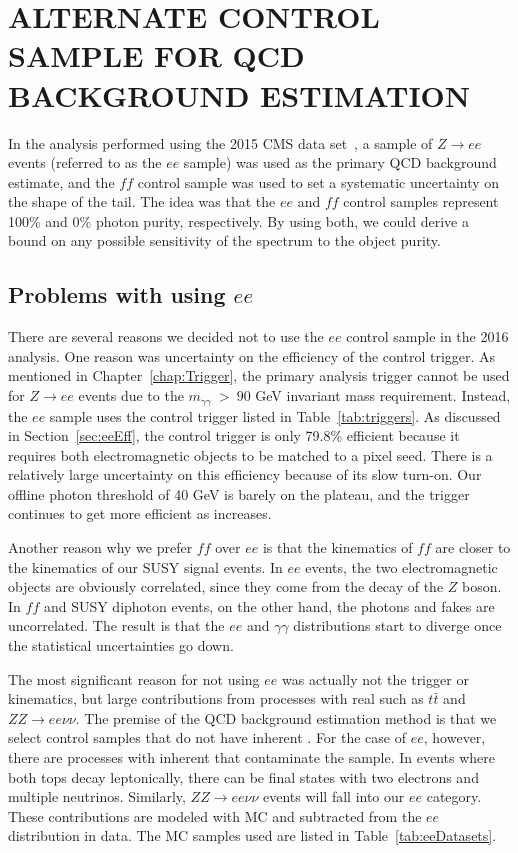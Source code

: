 \chapter{ALTERNATE CONTROL SAMPLE FOR QCD BACKGROUND ESTIMATION}
\label{app:ee}
In the analysis performed using the 2015 CMS data set~\cite{CMS:2015_anal}, 
a sample of $Z\rightarrow ee$ events (referred to as the $ee$ sample) was used as the 
primary QCD background estimate, and the $ff$ control 
sample was used to set a systematic uncertainty on the shape of the \ETmiss tail.
The idea was that the $ee$ and $ff$ control samples represent
100$\%$ and 0$\%$ photon purity, respectively. By using both, we could
derive a bound on any possible sensitivity of the \ETmiss spectrum
to the object purity. 

\section{Problems with using $ee$}
\label{sec:eeProblems}
There are several reasons we decided not to use the $ee$ control sample
 in the 2016 analysis. One reason was uncertainty on 
 the efficiency of the control 
 trigger. As mentioned in Chapter~\ref{chap:Trigger},
the primary analysis trigger 
cannot be used for $Z\rightarrow ee$ events due to the $m_{\gamma\gamma}~>~90$ GeV
invariant mass requirement. Instead, the $ee$ sample uses the control trigger 
listed in Table~\ref{tab:triggers}. As discussed in Section~\ref{sec:eeEff}, the
control trigger is only 79.8\% efficient because it 
requires both electromagnetic objects to be matched to a 
pixel seed. There is a relatively 
large uncertainty on this efficiency because of its
slow turn-on. Our offline photon \pT threshold of 40 GeV is 
barely on the plateau, and the trigger continues to get more efficient 
as \pT increases. 

Another reason why we prefer $ff$ over $ee$ is that the kinematics
of $ff$ are closer to the kinematics of our SUSY signal events.
In $ee$ events, the two electromagnetic objects are obviously correlated, 
since they come from the decay of the $Z$ boson. In $ff$ and SUSY diphoton
events, on the other hand, the photons and fakes are uncorrelated. The result
is that the $ee$ and $\gamma\gamma$ \ETmiss distributions start to diverge
once the statistical uncertainties go down. 

The most significant reason for not using $ee$ was actually 
not the trigger or kinematics, but large contributions from processes with real \ETmiss 
 such as $t\bar{t}$ and $ZZ\rightarrow ee\nu\nu$. 
The premise of the QCD background estimation method is that we 
select control samples that do not have inherent \ETmiss. 
For the case of $ee$, however,
there are processes with inherent \ETmiss that contaminate
the sample. 
In \ttbar events where both tops decay leptonically,
there can be final states with two electrons and
multiple neutrinos. Similarly, $ZZ \rightarrow ee\nu\nu$
events will fall into our $ee$ category.
These contributions are modeled with MC and subtracted 
from the $ee$ distribution in data. 
The MC samples used are listed in
Table~\ref{tab:eeDatasets}.

